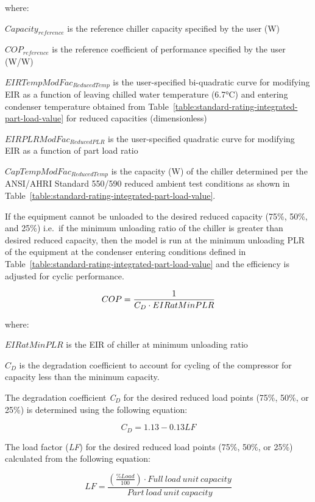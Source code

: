 where:

\(Capacit{y_{reference}}\) is the reference chiller capacity specified by the user (W)

\(CO{P_{reference}}\) is the reference coefficient of performance specified by the user (W/W)

\(EIRTempModFa{c_{ReducedTemp}}\) is the user-specified bi-quadratic curve for modifying EIR as a function of leaving chilled water temperature (6.7°C) and entering condenser temperature obtained from Table~\ref{table:standard-rating-integrated-part-load-value} for reduced capacities (dimensionless)

\(EIRPLRModFa{c_{ReducedPLR}}\) is the user-specified quadratic curve for modifying EIR as a function of part load ratio

\(CapTempModFa{c_{ReducedTemp}}\) is the capacity (W) of the chiller determined per the ANSI/AHRI Standard 550/590 reduced ambient test conditions as shown in Table~\ref{table:standard-rating-integrated-part-load-value}.

If the equipment cannot be unloaded to the desired reduced capacity (75\%, 50\%, and 25\%) i.e.~if the minimum unloading ratio of the chiller is greater than desired reduced capacity, then the model is run at the minimum unloading PLR of the equipment at the condenser entering conditions defined in Table~\ref{table:standard-rating-integrated-part-load-value} and the efficiency is adjusted for cyclic performance.

\begin{equation}
COP = \frac{{\rm{1}}}{{{C_D} \cdot EIRatMinPLR}}
\end{equation}

where:

\(EIRatMinPLR\) is the EIR of chiller at minimum unloading ratio

\({C_D}\) is the degradation coefficient to account for cycling of the compressor for capacity less than the minimum capacity.

The degradation coefficient \emph{C\(_{D}\)} for the desired reduced load points (75\%, 50\%, or 25\%) is determined using the following equation:

\begin{equation}
{C_D} = 1.13 - 0.13LF
\end{equation}

The load factor (\emph{LF}) for the desired reduced load points (75\%, 50\%, or 25\%) calculated from the following equation:

\begin{equation}
LF = \frac{{\left( {\frac{{\% Load}}{{100}}} \right) \cdot Full~load~unit~capacity}}{{Part~load~unit~capacity}}
\end{equation}

